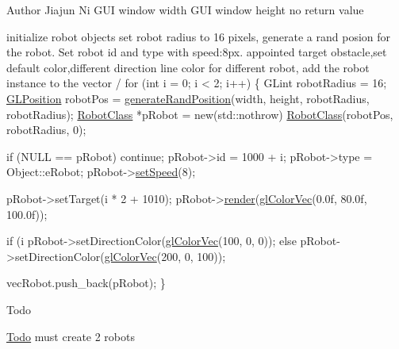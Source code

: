 \begin{DoxyAuthor}{Author}
Jiajun Ni  G\-U\-I window width  G\-U\-I window height no return value 
\end{DoxyAuthor}

\begin{DoxyCode}
   initialize robot objects
   set robot radius to 16 pixels,
   generate a rand posion \textcolor{keywordflow}{for} the robot.
   Set robot \textcolor{keywordtype}{id} and type with speed:8px.
   appointed target obstacle,set \textcolor{keywordflow}{default} color,different direction line color \textcolor{keywordflow}{for} different robot,
   add the robot instance to the vector
  / 
\textcolor{keywordflow}{for} (\textcolor{keywordtype}{int} i = 0; i < 2; i++)
\{
    GLint robotRadius = 16;
    \hyperlink{structGLPosition}{GLPosition} robotPos = \hyperlink{classEnvironmentClass_a330bbca10dbd5743714d7e722748ae47}{generateRandPosition}(width, height, robotRadius, 
      robotRadius);
    \hyperlink{classRobotClass}{RobotClass} *pRobot = \textcolor{keyword}{new}(std::nothrow) \hyperlink{classRobotClass}{RobotClass}(robotPos, robotRadius, 0);
    
    \textcolor{keywordflow}{if} (NULL == pRobot)
        \textcolor{keywordflow}{continue};
    pRobot->id = 1000 + i;
    pRobot->type = Object::eRobot;
    pRobot->\hyperlink{classRobotClass_ada07c364411e6d4c3efd6c5f5e4e6275}{setSpeed}(8);
    
    pRobot->setTarget(i * 2 + 1010);
    pRobot->\hyperlink{classRobotClass_af2069bec3bb391b05676e154527674fa}{render}(\hyperlink{Common_8h_a5113b6588451c418d38d8b3681eb6040}{glColorVec}(0.0f, 80.0f, 100.0f));
     
    \textcolor{keywordflow}{if} (i %
        pRobot->setDirectionColor(\hyperlink{Common_8h_a5113b6588451c418d38d8b3681eb6040}{glColorVec}(100, 0, 0));
    \textcolor{keywordflow}{else}
        pRobot->setDirectionColor(\hyperlink{Common_8h_a5113b6588451c418d38d8b3681eb6040}{glColorVec}(200, 0, 100));
         
    vecRobot.push\_back(pRobot);
\}
\end{DoxyCode}


\begin{DoxyRefDesc}{Todo}
\item[\hyperlink{todo__todo000001}{Todo}]must create 2 robots \end{DoxyRefDesc}



